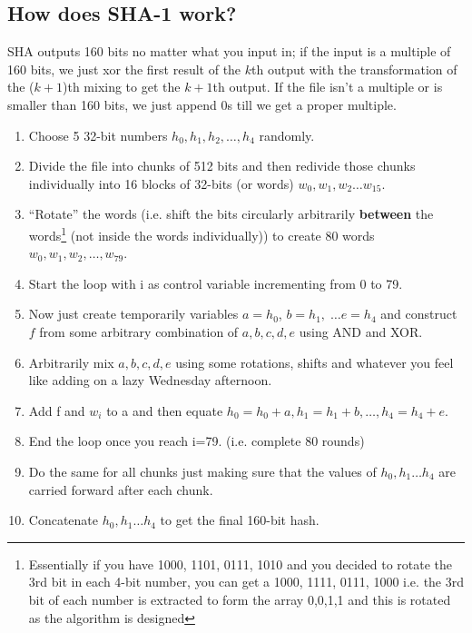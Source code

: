\begin{mdframed}
		\subsection{How does SHA-1 work?}
		SHA outputs 160 bits no matter what you input in; if the input is a multiple of 160 bits, we just xor the first result of the \(k\)th output with the transformation of the (\(k+1\))th mixing to get the \(k+1\)th output. If the file isn't a multiple or is smaller than 160 bits, we just append 0s till we get a proper multiple. 
			\begin{enumerate}
				\item Choose 5 32-bit numbers \(h_0, h_1, h_2, \ldots, h_4\) randomly.
				\item Divide the file into chunks of 512 bits and then redivide those chunks individually into 16 blocks of 32-bits (or words) \(w_0, w_1, w_2\ldots w_15\).
				\item ``Rotate'' the words (i.e. shift the bits circularly arbitrarily \textbf{between} the words\footnote{Essentially if you have 1000, 1101, 0111, 1010 and you decided to rotate the 3rd bit in each 4-bit number, you can get a 1000, 1111, 0111, 1000 i.e. the 3rd bit of each number is extracted to form the array {0,0,1,1} and this is rotated as the algorithm is designed} (not inside the words individually)) to create 80 words \(w_0, w_1, w_2, \ldots, w_{79}\).
				\item Start the loop with i as control variable incrementing from 0 to 79. 
				\item Now just create temporarily variables \(a=h_0\), \(b=h_1, \; \ldots e=h_4\) and construct \(f\) from some arbitrary combination of \(a, b, c, d, e\) using AND and XOR.
				\item Arbitrarily mix \(a, b, c, d, e\) using some rotations, shifts and whatever you feel like adding on a lazy Wednesday afternoon.
				\item Add f and \(w_i\) to a and then equate \(h_0=h_0+a, h_1=h_1+b, \ldots ,h_4=h_4+e\).
				\item End the loop once you reach i=79. (i.e. complete 80 rounds)
				\item Do the same for all chunks just making sure that the values of \(h_0, h_1\ldots h_4\) are carried forward after each chunk.
				\item Concatenate \(h_0, h_1\ldots h_4\) to get the final 160-bit hash.
			\end{enumerate}
\end{mdframed}
			
